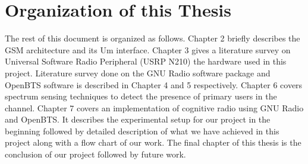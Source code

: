 \section{Organization of this Thesis}
The rest of this document is organized as follows. Chapter 2 briefly describes
the GSM architecture and its Um interface. Chapter 3 gives a literature survey
on Universal Software Radio Peripheral (USRP N210) the hardware used in this 
project. Literature survey done on the GNU Radio software package and OpenBTS 
software is described in Chapter 4 and 5 respectively. Chapter 6 covers 
spectrum sensing techniques to detect the presence of primary users in the 
channel.  Chapter 7 covers an implementation of cognitive radio using GNU Radio
and OpenBTS. It describes the experimental setup for our project in the 
beginning followed by detailed description of what we have achieved in this 
project along with a flow chart of our work. The final chapter of this thesis 
is the conclusion of our project followed by future work. 
